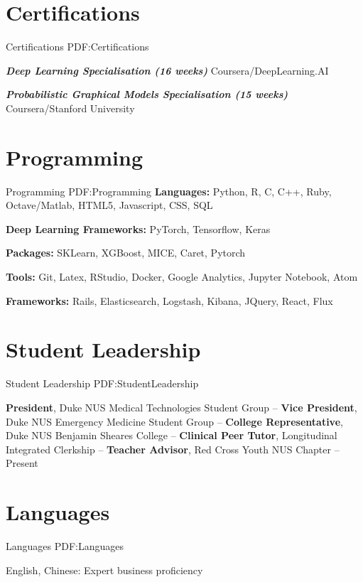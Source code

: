 \documentclass[letterpaper,10pt,oneside]{article}
\begin{document}
\begin{body}
\section
{Certifications}
{Certifications}
{PDF:Certifications}

\textbf{\textit{Deep Learning Specialisation (16 weeks)}} Coursera/DeepLearning.AI 
\hfill
{}

\textbf{\textit{Probabilistic Graphical Models Specialisation (15 weeks)}} Coursera/Stanford University 
\hfill
{}


\section
{Programming}
{Programming}
{PDF:Programming}
\textbf{Languages:} Python, R, C, C++, Ruby, Octave/Matlab, HTML5, Javascript, CSS, SQL

\textbf{Deep Learning Frameworks:}  PyTorch, Tensorflow, Keras

\textbf{Packages:} SKLearn, XGBoost, MICE, Caret, Pytorch

\textbf{Tools:} Git, Latex, RStudio, Docker, Google Analytics, Jupyter Notebook, Atom

\textbf{Frameworks:} Rails, Elasticsearch, Logstash, Kibana, JQuery, React, Flux


\section
{Student Leadership}
{Student Leadership}
{PDF:StudentLeadership}

\textbf{President}, Duke NUS Medical Technologies Student Group
\hfill
{} --  
\GapNoBreak
\textbf{Vice President}, Duke NUS Emergency Medicine Student Group
\hfill
{} --  
\GapNoBreak
\textbf{College Representative}, Duke NUS Benjamin Sheares College
\hfill
{} --  
\GapNoBreak
\textbf{Clinical Peer Tutor}, Longitudinal Integrated Clerkship
\hfill
{} --  
\GapNoBreak
\textbf{Teacher Advisor}, Red Cross Youth NUS Chapter
\hfill
{} -- Present

\section
{Languages}
{Languages}
{PDF:Languages}

English, Chinese: Expert business proficiency
\end{body}


\label{LastPage}~
\end{document}
